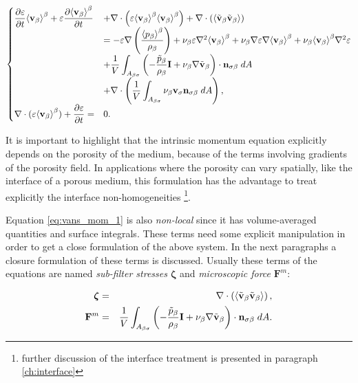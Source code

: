 \begin{eqnarray}
\begin{cases}
 \dfrac{\partial \varepsilon}{\partial t}{\left< \textbf{v}_{\beta} \right>}^{\beta} + \varepsilon \dfrac{\partial {\left< \textbf{v}_{\beta}\right>}^{\beta}}{\partial t} &+ \nabla \cdot \left(\varepsilon {\left< \textbf{v}_{\beta}\right>}^{\beta}{\left< \textbf{v}_{\beta} \right>}^{\beta}\right)   + \nabla \cdot \left({\left< \tilde{\textbf{v}}_{\beta} \tilde{\textbf{v}}_{\beta} \right>}\right)   \\
&= -\varepsilon \nabla \left(\dfrac{{\left< p_{\beta} \right>}^{\beta}}{\rho_{\beta}}\right) + \nu_{\beta} \varepsilon \nabla^2 {\left< \textbf{v}_{\beta} \right>}^{\beta} +  \nu_{\beta} \nabla \varepsilon \nabla {\left< \textbf{v}_{\beta}\right>}^{\beta} + \nu_{\beta} {\left< \textbf{v}_{\beta} \right>}^{\beta} \nabla^2 \varepsilon  \\
&+ \dfrac{1}{V} \displaystyle\int_{A_{\beta \sigma}} \left(-\dfrac{\tilde{p}_{\beta}}{\rho_{\beta}} \mathbf{I}  + \nu_{\beta} \nabla \tilde{\textbf{v}}_{\beta} \right)\cdot \mathbf{n}_{\sigma \beta} \;dA \\
& + \nabla \cdot \left( \dfrac{1}{V} \displaystyle\int_{A_{\beta \sigma}}  \nu_{\beta} \textbf{v}_{\sigma} \mathbf{n}_{\sigma \beta} \;dA \right), \\
\nabla \cdot (\varepsilon{\left< \textbf{v}_{\beta}\right>}^{\beta} ) + \dfrac{\partial \varepsilon}{\partial t} = &0.
\end{cases}
\label{eq:vans_mom_1}
\end{eqnarray}


It is important to highlight that the intrinsic momentum equation explicitly depends on the porosity of the medium, because of the terms involving gradients of the porosity field.
In applications where the porosity can vary spatially, like the interface of a porous medium, this formulation has the advantage to treat explicitly the interface non-homogeneities \footnote{further discussion of the interface treatment is presented in paragraph \ref{ch:interface}}.


Equation \eqref{eq:vans_mom_1} is also \textit{non-local} since it has volume-averaged quantities and surface integrals.
These terms need some explicit manipulation in order to get a close formulation of the above system.
In the next paragraphs a closure formulation of these terms is discussed. Usually these terms of the equations are named \textit{sub-filter stresses} $\boldsymbol{\zeta}$ and \textit{microscopic force} $\mathbf{F}^m$:

\begin{eqnarray}
\boldsymbol{\zeta}&=& \nabla \cdot \left({\left< \tilde{\textbf{v}}_{\beta} \tilde{\textbf{v}}_{\beta} \right>}\right), \nonumber \\
\mathbf{F}^m &=&  \dfrac{1}{V} \int_{A_{\beta \sigma}} \left(-\dfrac{\tilde{p}_{\beta}}{\rho_{\beta}} \mathbf{I}  + \nu_{\beta} \nabla \tilde{\textbf{v}}_{\beta} \right)\cdot \mathbf{n}_{\sigma \beta} \;dA. \nonumber
\end{eqnarray}


